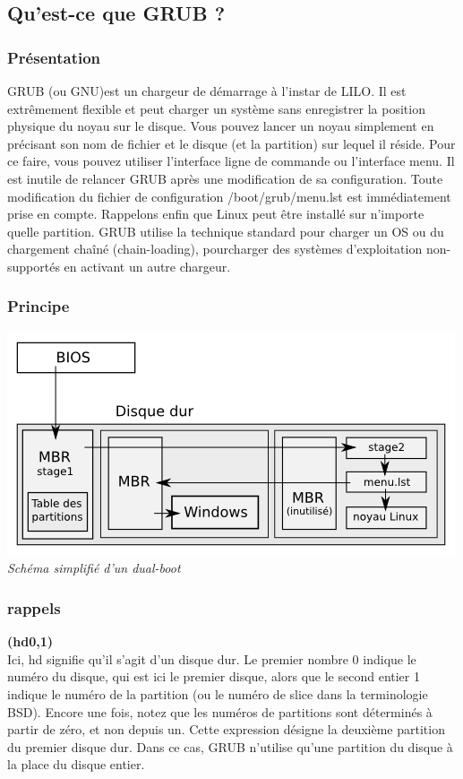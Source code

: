 \documentclass[10]{article}
\begin{document}
\subsection{Qu'est-ce que GRUB ?}
\subsubsection{Pr\'esentation}
GRUB (ou GNU)est un chargeur de d\'emarrage \`a  l'instar de LILO. Il est extr\^emement flexible et peut charger un syst\`eme sans enregistrer la position physique du noyau sur le disque. Vous pouvez lancer un noyau simplement en pr\'ecisant son nom de fichier et le disque (et la partition) sur lequel il r\'eside. Pour ce faire, vous pouvez utiliser l'interface ligne de commande ou l'interface menu. Il est inutile de relancer GRUB apr\`es une modification de sa configuration. Toute modification du fichier de configuration /boot/grub/menu.lst est imm\'ediatement prise en compte. Rappelons enfin que Linux peut être install\'e sur n'importe quelle partition. 
GRUB utilise la technique standard pour charger un OS ou du chargement chaîn\'e (chain-loading), pourcharger des syst\`emes d'exploitation non-support\'es en activant un autre chargeur.
\subsubsection{Principe}
\includegraphics{SchemaSimplifieGrubDualBoot}
\textit{Sch\'ema simplifi\'e d'un dual-boot}
\subsubsection{rappels}
\textbf{(hd0,1)}\\
Ici, hd signifie qu'il s'agit d'un disque dur. Le premier nombre 0 indique le num\'ero du disque, qui est ici le premier disque, alors que le second entier 1 indique le num\'ero de la partition (ou le num\'ero de slice dans la terminologie BSD). Encore une fois, notez que les num\'eros de partitions sont d\'etermin\'es \`a partir de z\'ero, et non depuis un. Cette expression d\'esigne la deuxi\`eme partition du premier disque dur. Dans ce cas, GRUB n'utilise qu'une partition du disque \`a la place du disque entier.  
\end{document}
